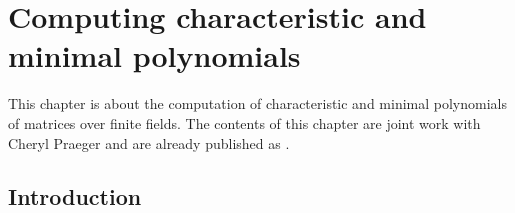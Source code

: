 
%
%
%
%

%

\chapter{Computing characteristic and minimal polynomials}

This chapter is about the computation of characteristic and minimal
polynomials of matrices over finite fields. The contents of this
chapter are joint work with Cheryl
Praeger and are already published as \cite{minpolypaper}.

\section{Introduction}

